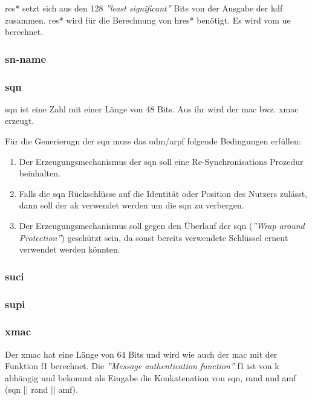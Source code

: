 \gls{res*} setzt sich aus den 128 \textit{''least significant''} Bits von der Ausgabe der \gls{kdf} zusammen.
\gls{res*} wird f\"ur die Berechnung von \gls{hres*} ben\"otigt.
Es wird vom \gls{ue} berechnet.

\subsubsection{\gls{sn-name}}

\subsubsection{\gls{sqn}}
\gls{sqn} ist eine Zahl mit einer L\"ange von 48 Bits. %
Aus ihr wird der \gls{mac} bwz. \gls{xmac} erzeugt. %

F\"ur die Generierugn der \gls{sqn} muss das \gls{udm}/\gls{arpf} folgende Bedingungen erf\"ullen:\\%
\begin{enumerate}
\item Der Erzeugungsmechanismus der \gls{sqn} soll eine Re-Synchronisations Prozedur beinhalten.\\
\item Falls die \gls{sqn} R\"uckschl\"usse auf die Identit\"at oder Position des Nutzers zul\"asst, dann soll der \gls{ak} verwendet werden um die \gls{sqn} zu verbergen.\\
\item Der Erzeugungsmechanismus soll gegen den \"Uberlauf der \gls{sqn} (\textit{''Wrap around Protection''}) gesch\"utzt sein, da sonst bereits verwendete Schl\"ussel erneut verwendet werden k\"onnten. 
\end{enumerate}

\subsubsection{\gls{suci}}

\subsubsection{\gls{supi}}

\subsubsection{\gls{xmac}}
Der \gls{xmac} hat eine L\"ange von 64 Bits und wird wie auch der \gls{mac} mit der Funktion f1 berechnet. %
Die \textit{''Message authentication function''} f1 ist von \gls{k} abh\"angig und bekommt als Eingabe die Konkatenation von \gls{sqn}, \gls{rand} und \gls{amf} (\gls{sqn} || \gls{rand} || \gls{amf}). %

